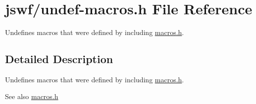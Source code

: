\hypertarget{undef-macros_8h}{\section{jswf/undef-\/macros.h File Reference}
\label{undef-macros_8h}
}


Undefines macros that were defined by including \hyperlink{macros_8h}{macros.\+h}.  




\subsection{Detailed Description}
Undefines macros that were defined by including \hyperlink{macros_8h}{macros.\+h}. 

\begin{DoxySeeAlso}{See also}
\hyperlink{macros_8h}{macros.\+h} 
\end{DoxySeeAlso}
